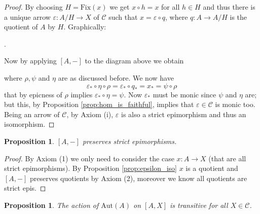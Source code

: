\documentclass[italian, 12pt, reqno]{article}
\theoremstyle{myteo}
\newtheorem{proposition}[theorem]{Proposition}
\numberwithin{equation}{section}
\newcommand{\cat}[1]{\mathscr{#1}}
\newcommand{\fix}[1]{\text{Fix}(#1)}
\newcommand{\homs}[2]{[#1, #2]}
\newcommand{\fun}[3]{#1\colon#2\to #3}
\begin{document}
\begin{proof}
  By choosing \(H = \fix{x}\) we get \(x\circ h = x\) for all \(h\in H\) and thus there is a unique arrow \(\fun{\varepsilon}{A/H}{X}\) of \(\cat{C}\) such that \(x = \varepsilon\circ q\), where \(\fun{q}{A}{A/H}\) is the quotient of \(A\) by \(H\).
  Graphically:

  \begin{center}
    .
  \end{center}

  Now by applying \(\homs{A}{-}\) to the diagram above we obtain

  \begin{center}
  \end{center}
  where \(\rho, \psi\) and \(\eta\) are as discussed before.
  We now have
  \[\varepsilon_*\circ \eta\circ\rho = \varepsilon_*\circ q_* = x_* = \psi\circ \rho\]
  that by epicness of \(\rho\) implies \(\varepsilon_*\circ \eta = \psi\).
  Now \(\varepsilon_*\) must be monic since \(\psi\) and \(\eta\) are; but this, by Proposition \ref{prop:hom_is_faithful}, implies that \(\varepsilon\in\cat{C}\) is monic too.
  Being an arrow of \(\cat{C}\), by Axiom (i), \(\varepsilon\) is also a strict epimorphism and thus an isomorphism.
\end{proof}

\begin{proposition}
  \label{prop:preservation_of_strict_epi}
  \(\homs{A}{-}\) preserves strict epimorphisms.
\end{proposition}

\begin{proof}
  By Axiom (1) we only need to consider the case \(\fun{x}{A}{X}\) (that are all strict epimorphisms).
  By Proposition \ref{prop:epsilon_iso} \(x\) is a quotient and \(\homs{A}{-}\) preserves quotients by Axiom (2), moreover we know all quotients are strict epis.
\end{proof}

\begin{proposition}
  \label{prop:transitive_action}
  The action of \(\text{Aut}(A)\) on \(\homs{A}{X}\) is transitive for all \(X\in\cat{C}\).
\end{proposition}
\end{document}
